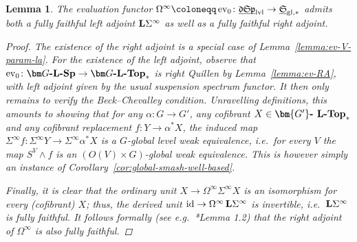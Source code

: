 \documentclass[reqno]{memo-l}
\theoremstyle{mythm}
\newtheorem{lemma}[thm]{Lemma}
\theoremstyle{definition}
\numberwithin{equation}{section}
\newcommand{\gl}{\textup{gl}}
\DeclareMathOperator{\ev}{ev}
\newcommand{\cat}[1]{\textbf{\textup{#1}}}
\newcommand{\id}{\textup{id}}
\newcommand{\ulhelper}[2]{\underline{\setbox0=\hbox{$#1#2$}\dp0=0.4pt \box0\relax}}
\newcommand{\ul}[1]{{\mathpalette\ulhelper{#1}}\hbox{\rule[-2pt]{0pt}{0pt}}}
\let\smashp=\wedge
\newcommand{\mySp}{{\mathfrak S\kern-.5pt\mathfrak p}}
\newcommand{\myLSp}{{\mathfrak d\kern-.25pt}\mySp}
\newcommand{\ulmySplev}{\ul{\myLSp}_\textup{lvl}}
\newcommand{\myS}{{{\mathfrak S\kern-.4pt}}}
\begin{document}
\begin{lemma}\label{lemma:omega-oo-both-adjoints}
    The evaluation functor $\Omega^\infty\coloneqq\ev_0\colon\ulmySplev\to\ul\myS_{\gl,*}$ admits both a fully faithful left adjoint $\cat{L}\Sigma^\infty$ as well as a fully faithful right adjoint.
    \begin{proof}
        The existence of the right adjoint is a special case of Lemma~\ref{lemma:ev-V-param-la}. For the existence of the left adjoint, observe that $\ev_0\colon\cat{$\bm G$-$\cat{L}$-Sp}\to\cat{$\bm G$-$\cat{L}$-Top}_*$ is right Quillen by Lemma~\ref{lemma:ev-RA}, with left adjoint given by the usual suspension spectrum functor. It then only remains to verify the Beck--Chevalley condition. Unravelling definitions, this amounts to showing that for any $\alpha\colon G\to G'$, any cofibrant $X\in\cat{$\bm{G'}$-$\cat{ L}$-Top}_*$ and any cofibrant replacement $f\colon Y\to \alpha^*X$, the induced map $\Sigma^\infty f\colon \Sigma^\infty Y\to \Sigma^\infty \alpha^*X$ is a $G$-global level weak equivalence, i.e.\ for every $V$ the map $S^V\smashp f$ is an $(O(V)\times G)$-global weak equivalence. This is however simply an instance of Corollary~\ref{cor:global-smash-well-based}.

        Finally, it is clear that the ordinary unit $X\to\Omega^\infty \Sigma^\infty X$ is an isomorphism for every (cofibrant) $X$; thus, the derived unit $\id\to\Omega^\infty\,\cat{L}\Sigma^\infty$ is invertible, i.e.\ $\cat{L}\Sigma^\infty$ is fully faithful. 
        It follows formally (see e.g.~\cite{haine2025fullyfaithfulfunctorspushouts}*{Lemma 1.2}) that the right adjoint of $\Omega^\infty$ is also fully faithful.
    \end{proof}
\end{lemma}
\end{document}
